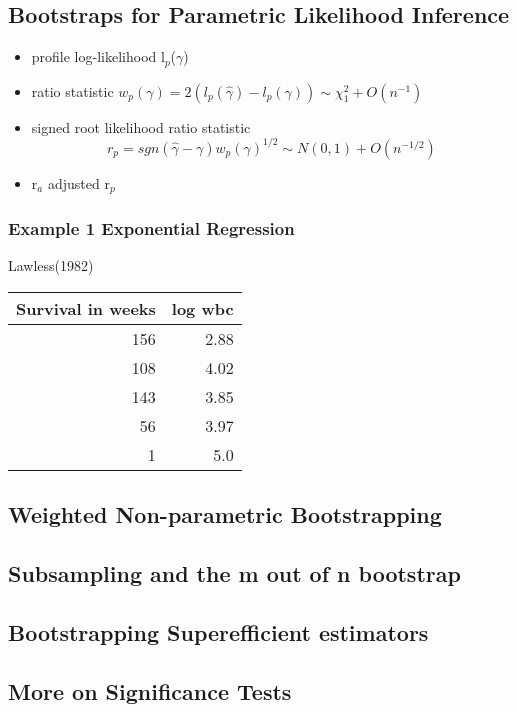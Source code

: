 \documentclass[11pt]{article}
\begin{document}
\subsection{Bootstraps for Parametric Likelihood Inference}
\label{sec-2-3}


\begin{itemize}
\item profile log-likelihood l$_p$($\gamma$)
\item ratio statistic $w_p(\gamma) = 2(l_p(\hat{\gamma})-l_p(\gamma)) \sim
  \chi^2_1 + O(n^{-1})$
\item signed root likelihood ratio statistic $$r_p =
  sgn(\hat{\gamma}-\gamma)w_p(\gamma)^{1/2} \sim N(0,1) +
  O(n^{-1/2})$$
\item r$_a$ adjusted r$_p$
\end{itemize}
\subsubsection{Example 1 Exponential Regression}
\label{sec-2-3-1}

Lawless(1982)


\begin{center}
\begin{tabular}{rr}
 Survival in weeks  &  log wbc  \\
\hline
               156  &     2.88  \\
               108  &     4.02  \\
               143  &     3.85  \\
                56  &     3.97  \\
                 1  &      5.0  \\
\hline
\end{tabular}
\end{center}
\subsection{Weighted Non-parametric Bootstrapping}
\label{sec-2-4}
\subsection{Subsampling and the m out of n bootstrap}
\label{sec-2-5}
\subsection{Bootstrapping Superefficient estimators}
\label{sec-2-6}
\subsection{More on Significance Tests}
\label{sec-2-7}
\end{document}
